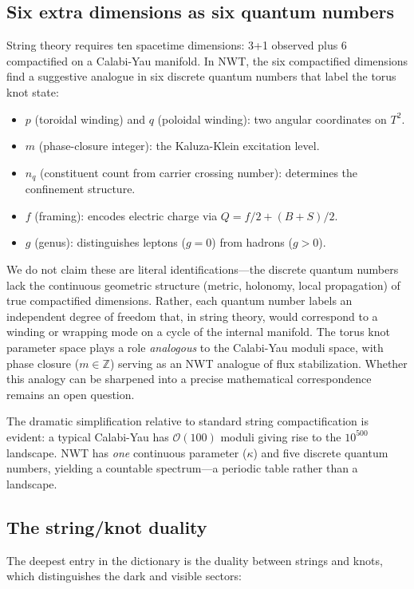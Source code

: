 \documentclass[11pt]{article}
\begin{document}
\subsection{Six extra dimensions as six quantum numbers}

String theory requires ten spacetime dimensions: 3+1 observed plus 6 compactified on a Calabi-Yau manifold.
In NWT, the six compactified dimensions find a suggestive analogue in six discrete quantum numbers that label the torus knot state:
\begin{itemize}
\item $p$ (toroidal winding) and $q$ (poloidal winding): two angular coordinates on $T^2$.
\item $m$ (phase-closure integer): the Kaluza-Klein excitation level.
\item $n_q$ (constituent count from carrier crossing number): determines the confinement structure.
\item $f$ (framing): encodes electric charge via $Q = f/2 + (B+S)/2$.
\item $g$ (genus): distinguishes leptons ($g = 0$) from hadrons ($g > 0$).
\end{itemize}

We do not claim these are literal identifications---the discrete quantum numbers lack the continuous geometric structure (metric, holonomy, local propagation) of true compactified dimensions.
Rather, each quantum number labels an independent degree of freedom that, in string theory, would correspond to a winding or wrapping mode on a cycle of the internal manifold.
The torus knot parameter space plays a role \emph{analogous} to the Calabi-Yau moduli space, with phase closure ($m \in \mathbb{Z}$) serving as an NWT analogue of flux stabilization.
Whether this analogy can be sharpened into a precise mathematical correspondence remains an open question.

The dramatic simplification relative to standard string compactification is evident: a typical Calabi-Yau has $\mathcal{O}(100)$ moduli giving rise to the $10^{500}$ landscape.
NWT has \emph{one} continuous parameter ($\kappa$) and five discrete quantum numbers, yielding a countable spectrum---a periodic table rather than a landscape.

\subsection{The string/knot duality}

The deepest entry in the dictionary is the duality between strings and knots, which distinguishes the dark and visible sectors:
\end{document}
